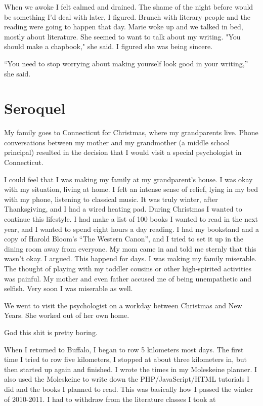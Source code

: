 \documentclass[12pt]{article}
\begin{document}
When we awoke I felt calmed and drained.  The shame of the night before would be
something I'd deal with later, I figured.  Brunch with literary people and the
reading were going to happen that day.  Marie woke up and we talked in bed,
mostly about literature.  She seemed to want to talk about my writing.  "You
should make a chapbook," she said.  I figured she was being sincere.  

``You need to stop worrying about making yourself look good in your writing,'' she
said.

\section{Seroquel}
My family goes to Connecticut for Christmas, where my grandparents live.  Phone
conversations between my mother and my grandmother (a middle school principal)
resulted in the decision that I would visit a special psychologist in
Connecticut.

I could feel that I was making my family at my grandparent's house.  I was okay
with my situation, living at home.  I felt an intense sense of relief, lying in
my bed with my phone, listening to classical music.  It was truly winter, after
Thanksgiving, and I had a wired heating pad.  During Christmas I wanted to
continue this lifestyle.  I had make a list of 100 books I wanted to read in the
next year, and I wanted to spend eight hours a day reading.  I had my bookstand
and a copy of Harold Bloom's ``The Western Canon'', and I tried to set it up in
the dining room away from everyone.  My mom came in and told me sternly that
this wasn't okay.  I argued.  This happend for days.  I was making my family
miserable.  The thought of playing with my toddler cousins or other
high-spirited activities was painful.  My mother and even father accused me of
being unempathetic and selfish.  Very soon I was miserable as well.

We went to visit the psychologist on a workday between Christmas and New
Years.  She worked out of her own home. 

God this shit is pretty boring.

When I returned to Buffalo, I began to row 5 kilometers most days.  The first
time I tried to row five kilometers, I stopped at about three kilometers in, but
then started up again and finished.  I wrote the times in my Moleskeine planner.
I also used the Moleskeine to write down the PHP/JavaScript/HTML tutorials I did
and the books I planned to read.  This was basically how I passed the winter of
2010-2011.  I had to withdraw from the literature classes I took at 
\end{document}
